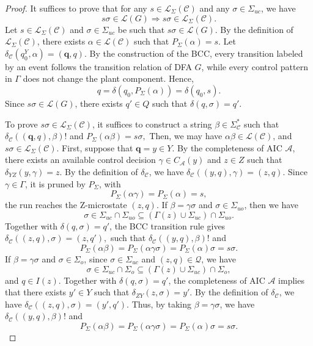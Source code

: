 \documentclass[journal,twoside,web]{ieeecolor}
\begin{document}
%
\begin{proof}
It suffices to prove that for any 
$s \in \mathcal{L}_{\Sigma}(\mathcal{C})$ and any 
$\sigma \in \Sigma_{uc}$, we have
$$
    s\sigma \in \mathcal{L}(G) \Rightarrow s\sigma \in \mathcal{L}_{\Sigma}(\mathcal{C}).
$$
Let $s \in \mathcal{L}_{\Sigma}(\mathcal{C})$ and
$\sigma \in \Sigma_{uc}$ be such that
$
    s\sigma \in \mathcal{L}(G).
$
By the definition of $\mathcal{L}_{\Sigma}(\mathcal{C})$, there exists
$\alpha \in \mathcal{L}(\mathcal{C})$ such that
$
    P_\Sigma(\alpha) = s.
$
Let
$
    \delta_{\mathcal{C}}(q^Y_0,\alpha)=(\bm{q},q).
$
By the construction of the BCC, every transition labeled by an event follows
the transition relation of DFA $G$, while every control pattern in $\Gamma$
does not change the plant component. Hence,
$$
    q = \delta(q_0,P_\Sigma(\alpha)) = \delta(q_0,s).
$$
Since $s\sigma\in\mathcal{L}(G)$, there exists $q'\in Q$ such that
$
    \delta(q,\sigma) = q'.
$

To prove $s\sigma \in \mathcal{L}_{\Sigma}(\mathcal{C})$, it suffices to
construct a string $\beta \in \Sigma_{\mathcal{C}}^*$ such that
$
    \delta_{\mathcal{C}}((\bm{q},q),\beta)!
$
and
$
    P_\Sigma(\alpha\beta) = s\sigma,
$
Then, we may have $\alpha \beta \in \mathcal{L}(\mathcal{C})$, and
$s\sigma \in \mathcal{L}_{\Sigma}(\mathcal{C})$.
%
First, suppose that $\bm{q} = y \in Y$. By the completeness of AIC
$\mathcal{A}$, there exists an available control decision
$\gamma \in C_{\mathcal{A}}(y)$ and $z\in Z$ such that
$
    \delta_{YZ}(y,\gamma) = z.
$
By the definition of $\delta_{\mathcal{C}}$, we have
$
    \delta_{\mathcal{C}}((y,q),\gamma) = (z,q).
$
Since $\gamma \in \Gamma$, it is pruned by $P_\Sigma$, with
$$
    P_\Sigma(\alpha\gamma) = P_\Sigma(\alpha) = s,
$$
the run reaches the Z-microstate $(z,q)$.
%
If $\beta = \gamma \sigma$ and $\sigma \in \Sigma_{uo}$, then we have
$$
    \sigma\in\Sigma_{uc}\cap\Sigma_{uo} \subseteq (\Gamma(z)\cup\Sigma_{uc})\cap\Sigma_{uo}.
$$
Together with $\delta(q,\sigma) = q'$, the BCC transition rule gives
$
    \delta_{\mathcal{C}}((z,q),\sigma) = (z,q'),
$
such that
$
    \delta_{\mathcal{C}}((y,q),\beta)!
$
and
$$
    P_\Sigma(\alpha\beta) = P_\Sigma(\alpha\gamma\sigma) = P_\Sigma(\alpha)\sigma = s \sigma.
$$
%
If $\beta = \gamma \sigma$ and $\sigma \in \Sigma_o$, since $\sigma \in \Sigma_{uc}$ and $(z,q) \in \bm{\mathcal{Q}}$, we have
$$
    \sigma\in\Sigma_{uc}\cap\Sigma_o \subseteq (\Gamma(z)\cup\Sigma_{uc})\cap\Sigma_o,
$$
and $q\in I(z)$. 
Together with $\delta(q,\sigma) = q'$, the completeness of AIC $\mathcal{A}$ implies that there exists $y'\in Y$ such that
$
    \delta_{ZY}(z,\sigma) = y'.
$
By the definition of $\delta_{\mathcal{C}}$, we have
$
    \delta_{\mathcal{C}}((z,q),\sigma) = (y',q').
$
Thus, by taking $\beta = \gamma\sigma$, we have
$
    \delta_{\mathcal{C}}((y,q), \beta)!
$
and
$$
    P_\Sigma(\alpha\beta) = P_\Sigma(\alpha\gamma\sigma) = P_\Sigma(\alpha)\sigma = s\sigma.
$$


\end{proof}
\end{document}
